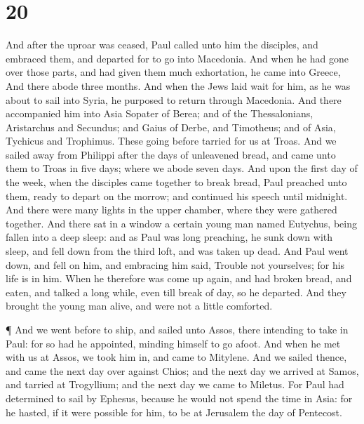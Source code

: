\hypertarget{section-19}{%
\section{20}\label{section-19}}

 And after the uproar was ceased, Paul called unto him the
disciples, and embraced them, and departed for to go into Macedonia.
 And when he had gone over those parts, and had given them
much exhortation, he came into Greece,  And there abode
three months. And when the Jews laid wait for him, as he was about to
sail into Syria, he purposed to return through Macedonia. 
And there accompanied him into Asia Sopater of Berea; and of the
Thessalonians, Aristarchus and Secundus; and Gaius of Derbe, and
Timotheus; and of Asia, Tychicus and Trophimus.  These going
before tarried for us at Troas.  And we sailed away from
Philippi after the days of unleavened bread, and came unto them to Troas
in five days; where we abode seven days.  And upon the first
day of the week, when the disciples came together to break bread, Paul
preached unto them, ready to depart on the morrow; and continued his
speech until midnight.  And there were many lights in the
upper chamber, where they were gathered together.  And there
sat in a window a certain young man named Eutychus, being fallen into a
deep sleep: and as Paul was long preaching, he sunk down with sleep, and
fell down from the third loft, and was taken up dead.  And
Paul went down, and fell on him, and embracing him said, Trouble not
yourselves; for his life is in him.  When he therefore was
come up again, and had broken bread, and eaten, and talked a long while,
even till break of day, so he departed.  And they brought
the young man alive, and were not a little comforted.

 ¶ And we went before to ship, and sailed unto Assos, there
intending to take in Paul: for so had he appointed, minding himself to
go afoot.  And when he met with us at Assos, we took him
in, and came to Mitylene.  And we sailed thence, and came
the next day over against Chios; and the next day we arrived at Samos,
and tarried at Trogyllium; and the next day we came to Miletus.
 For Paul had determined to sail by Ephesus, because he
would not spend the time in Asia: for he hasted, if it were possible for
him, to be at Jerusalem the day of Pentecost.

